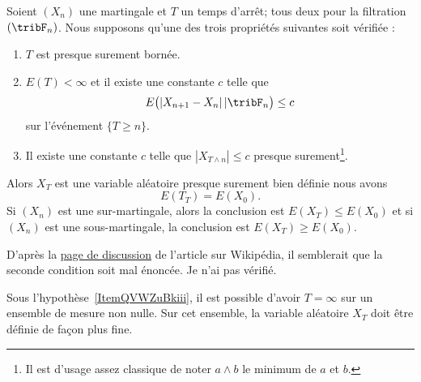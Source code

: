 \begin{theorem} \label{ThoZTrdjtZ}
    Soient \( (X_n)\) une martingale et \( T\) un temps d'arrêt; tous deux pour la filtration \( (\tribF_n)\). Nous supposons qu'une des trois propriétés suivantes soit vérifiée :
    \begin{enumerate}
        \item
            \( T\) est presque surement bornée.
        \item
            \( E(T)<\infty\) et il existe une constante \( c\) telle que
            \begin{equation}
                E\big( | X_{n+1}-X_n |\,|\tribF_n \big)\leq c
            \end{equation}
            sur l'événement \( \{ T\geq n \}\).
        \item   \label{ItemQVWZuBkiii}
            Il existe une constante \( c\) telle que \( | X_{T\wedge n} |\leq c\) presque surement\footnote{Il est d'usage assez classique de noter \( a\wedge b\) le minimum de \( a\) et \( b\).}.
    \end{enumerate}
    Alors \( X_T\) est une variable aléatoire presque surement bien définie nous avons
    \begin{equation}
        E(T_T)=E(X_0).
    \end{equation}
    Si \( (X_n)\) est une sur-martingale, alors la conclusion est \( E(X_T)\leq E(X_0)\) et si \( (X_n)\) est une sous-martingale, la conclusion est \( E(X_T)\geq E(X_0)\).
\end{theorem}

\begin{probleme}
    D'après la \href{https://en.wikipedia.org/wiki/Talk:Optional_stopping_theorem}{page de discussion} de l'article sur Wikipédia, il semblerait que la seconde condition soit mal énoncée. Je n'ai pas vérifié.
\end{probleme}

\begin{remark}
    Sous l'hypothèse~\ref{ItemQVWZuBkiii}, il est possible d'avoir \( T=\infty\) sur un ensemble de mesure non nulle. Sur cet ensemble, la variable aléatoire \( X_T\) doit être définie de façon plus fine.
\end{remark}

